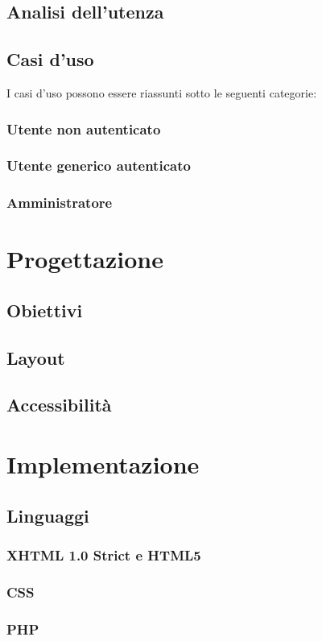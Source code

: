 \documentclass{article}
\begin{document}
		\subsection{Analisi dell'utenza}
		\subsection{Casi d'uso}
			I casi d'uso possono essere riassunti sotto le seguenti categorie:
			\subsubsection{Utente non autenticato}
			\subsubsection{Utente generico autenticato}
			\subsubsection{Amministratore}
	\section{Progettazione}
		\subsection{Obiettivi}
		\subsection{Layout}
		\subsection{Accessibilità}
	\section{Implementazione}
		\subsection{Linguaggi}
			\subsubsection{XHTML 1.0 Strict e HTML5}
			\subsubsection{CSS}
			\subsubsection{PHP}
\end{document}

